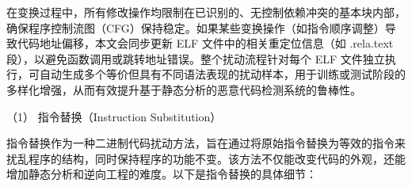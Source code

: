 
在变换过程中，所有修改操作均限制在已识别的、无控制依赖冲突的基本块内部，确保程序控制流图（CFG）保持稳定。如果某些变换操作（如指令顺序调整）导致代码地址偏移，本文会同步更新 ELF 文件中的相关重定位信息（如 .rela.text 段），以避免函数调用或跳转地址错误。整个扰动流程针对每个 ELF 文件独立执行，可自动生成多个等价但具有不同语法表现的扰动样本，用于训练或测试阶段的多样化增强，从而有效提升基于静态分析的恶意代码检测系统的鲁棒性。


（1） 指令替换（Instruction Substitution）


指令替换作为一种二进制代码扰动方法，旨在通过将原始指令替换为等效的指令来扰乱程序的结构，同时保持程序的功能不变。该方法不仅能改变代码的外观，还能增加静态分析和逆向工程的难度。以下是指令替换的具体细节：

